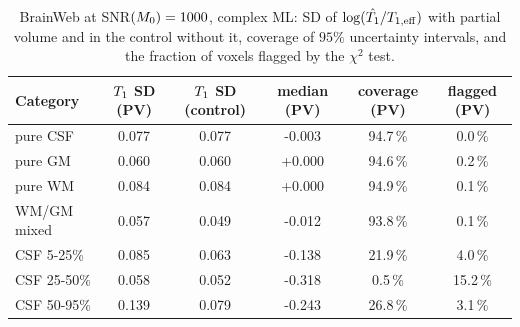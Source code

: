 \begin{table}[!htbp]
\centering
\caption{BrainWeb at SNR$(M_0)=1000$, complex ML: SD of $\log(\hat{T_1}/T_{1,\rm eff})$ with partial volume and in the control without it, coverage of $95\%$ uncertainty intervals, and the fraction of voxels flagged by the $\chi^2$ test.}
\label{tab:bwnoisy}
\footnotesize
\begin{tabular}{lccccc}
\toprule
Category & $T_1$ SD (PV) & $T_1$ SD (control) & median (PV) & coverage (PV) & flagged (PV)\\
\midrule
pure CSF & 0.077 & 0.077 & -0.003 & 94.7\,\% & 0.0\,\%\\
pure GM & 0.060 & 0.060 & +0.000 & 94.6\,\% & 0.2\,\%\\
pure WM & 0.084 & 0.084 & +0.000 & 94.9\,\% & 0.1\,\%\\
WM/GM mixed & 0.057 & 0.049 & -0.012 & 93.8\,\% & 0.1\,\%\\
CSF 5-25\% & 0.085 & 0.063 & -0.138 & 21.9\,\% & 4.0\,\%\\
CSF 25-50\% & 0.058 & 0.052 & -0.318 & 0.5\,\% & 15.2\,\%\\
CSF 50-95\% & 0.139 & 0.079 & -0.243 & 26.8\,\% & 3.1\,\%\\
\bottomrule
\end{tabular}
\end{table}
